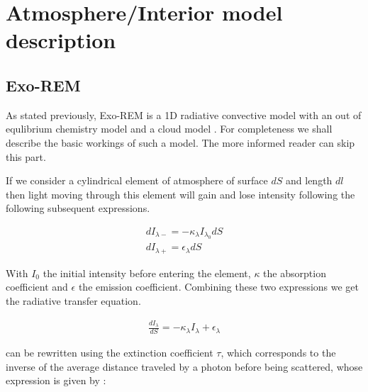 \section{Atmosphere/Interior model description}
\subsection{Exo-REM}

As stated previously, Exo-REM \parencite{baudino_interpreting_2015} is a 1D radiative convective model with an out of equlibrium chemistry model \parencite{baudino_toward_2017} and a cloud model \parencite{charnay_self-consistent_2018}. For completeness we shall describe the basic workings of such a model. The more informed reader can skip this part.\par
If we consider a cylindrical element of atmosphere of surface $dS$ and length $dl$ then light moving through this element will gain and lose intensity following the following subsequent expressions. 

\begin{align} %
    dI_{\lambda -} = -\kappa_{\lambda} I_{\lambda_0} dS \nonumber \\
    dI_{\lambda +} = \epsilon_{\lambda} dS
\end{align}

With $I_{0}$ the initial intensity before entering the element, $\kappa$ the absorption coefficient and $\epsilon$ the emission coefficient. Combining these two expressions we get the radiative transfer equation.

\begin{align}
    \frac{dI_{\lambda}}{dS} = -\kappa_{\lambda} I_{\lambda} + \epsilon_{\lambda} \label{eq:pre-RTE}
\end{align}

can be rewritten using the extinction coefficient $\tau$, which corresponds to the inverse of the average distance traveled by a photon before being scattered, whose expression is given by :


